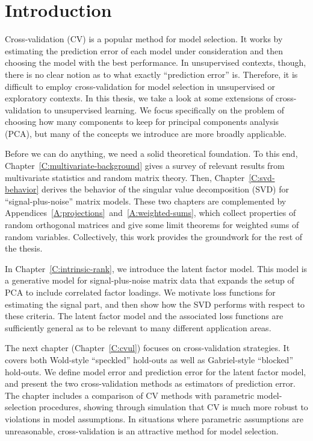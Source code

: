 \chapter{Introduction}

Cross-validation (CV) is a popular method for model selection.  It works by estimating the prediction error of each model under consideration and then choosing the model with the best performance.  In unsupervised contexts, though, there is no clear notion as to what exactly ``prediction error'' is.  Therefore, it is difficult to employ cross-validation for model selection in unsupervised or exploratory contexts.  In this thesis, we take a look at some extensions of cross-validation to unsupervised learning.  We focus specifically on the problem of choosing how many components to keep for principal components analysis (PCA), but many of the concepts we introduce are more broadly applicable.

Before we can do anything, we need a solid theoretical foundation.  To this end, Chapter~\ref{C:multivariate-background} gives a survey of relevant results from multivariate statistics and random matrix theory.  Then, Chapter~\ref{C:svd-behavior} derives the behavior of the singular value decomposition (SVD) for ``signal-plus-noise'' matrix models.  These two chapters are complemented by Appendices~\ref{A:projections}~and~\ref{A:weighted-sums}, which collect properties of random orthogonal matrices and give some limit theorems for weighted sums of random variables.  Collectively, this work provides the groundwork for the rest of the thesis.

In Chapter~\ref{C:intrinsic-rank}, we introduce the latent factor model.  This model is a generative model for signal-plus-noise matrix data that expands the setup of PCA to include correlated factor loadings.  We motivate loss functions for estimating the signal part, and then show how the SVD performs with respect to these criteria.  The latent factor model and the associated loss functions are sufficiently general as to be relevant to many different application areas.

The next chapter (Chapter~\ref{C:cvul}) focuses on cross-validation strategies.  It covers both Wold-style ``speckled'' hold-outs as well as Gabriel-style ``blocked'' hold-outs.  We define model error and prediction error for the latent factor model, and present the two cross-validation methods as estimators of prediction error.  The chapter includes a comparison of CV methods with parametric model-selection procedures, showing through simulation that CV is much more robust to violations in model assumptions.  In situations where parametric assumptions are unreasonable, cross-validation is an attractive method for model selection.

